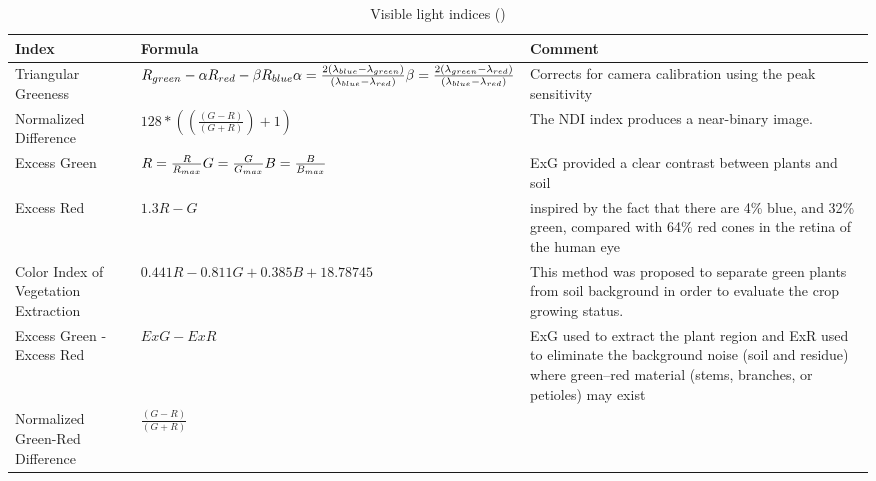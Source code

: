 \documentclass[letterpaper]{article}
\begin{document}
%
%
{\renewcommand{\arraystretch}{2}%
\begin{table}[H]
    \caption{Visible light indices (\cite{Hamuda2016-dw,Hunt2013-ih})}
    \label{fig:indices}
    \begin{tabular}{  l  p{4cm}  p{5cm} }
        \toprule
\textbf{Index}      
& \textbf{Formula}   
& \textbf{Comment} \\\midrule
Triangular Greeness
& \begin{minipage}[t]{0.3\textwidth}
	$R_{green} - \alpha R_{red} - \beta R_{blue}\\ \alpha = \frac {2(\lambda_{blue} - \lambda_{green})} {(\lambda_{blue} - \lambda_{red})}\\ 
    	\beta = \frac {2(\lambda_{green} - \lambda_{red})} {(\lambda_{blue} - \lambda_{red})} $
   \end{minipage}     
& Corrects for camera calibration using the peak sensitivity \\\hline
Normalized Difference     
& $128 * \left( \left( \frac {(G - R)} {(G + R)} \right) + 1 \right) $                    
& The NDI index produces a near-binary image.  \\\hline
Excess Green      
& \begin{minipage}[t]{0.3\textwidth}
	$R = \frac {R} {R_{max}}\\ G = \frac {G} {G_{max}}\\ B = \frac {B} {B_{max}}$ 
   \end{minipage}
& ExG provided a clear contrast between plants and soil \\\hline
Excess Red      
& $1.3 R - G$ 
& inspired by the fact that there are 4\% blue, and 32\% green, compared with 64\% red cones in the retina of the human eye \\\hline
Color Index of Vegetation Extraction      
& $0.441 R - 0.811 G + 0.385 B + 18.78745$
& This method was proposed to separate green plants from soil background in order to evaluate the crop growing status. \\\hline
Excess Green - Excess Red   
& $ExG - ExR$ 
& ExG used to extract the plant region and ExR used to eliminate the background noise (soil and residue) where green–red material (stems, branches, or petioles) may exist \\\hline
Normalized Green-Red Difference    
& $\frac {(G - R)} {(G + R)}$ 

\end{tabular}
\end{table}}
\end{document}
